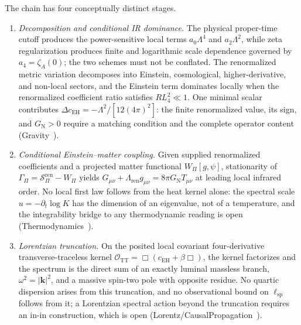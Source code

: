 \documentclass[11pt,a4paper]{article}
\theoremstyle{definition}
\newcommand{\SPI}{\mathcal{S}_\Pi}
\newcommand{\lsp}{\ell_{\mathrm{sp}}}
\newcommand{\GN}{G_{\mathrm{N}}}
\newcommand{\cEH}{c_{\mathrm{EH}}}
\begin{document}
    The chain has four conceptually distinct stages.

    \begin{enumerate}
      \item \textit{Decomposition and conditional IR dominance.}
      The physical proper-time cutoff produces the power-sensitive local terms
      $a_0\Lambda^4$ and $a_2\Lambda^2$, while zeta regularization produces finite and
      logarithmic scale dependence governed by $a_4 = \zeta_A(0)$; the two schemes must not
      be conflated.
      The renormalized metric variation decomposes into Einstein, cosmological,
      higher-derivative, and non-local sectors, and the Einstein term dominates locally when
      the renormalized coefficient ratio satisfies $R L_4^2 \ll 1$.
      One minimal scalar contributes $\Delta\cEH = -\Lambda^2/[12(4\pi)^2]$: the finite
      renormalized value, its sign, and $\GN > 0$ require a matching condition and the
      complete operator content (Gravity~\cite{Beau2026h}).

      \item \textit{Conditional Einstein--matter coupling.}
      Given supplied renormalized coefficients and a projected matter functional
      $W_\Pi[g, \psi]$, stationarity of $\Gamma_\Pi = \SPI^{\mathrm{ren}} - W_\Pi$ yields
      $G_{\mu\nu} + \Lambda_{\mathrm{ren}} g_{\mu\nu} = 8\pi\GN T_{\mu\nu}$ at leading local infrared order.
      No local first law follows from the heat kernel alone: the spectral scale
      $u = -\partial_t\log K$ has the dimension of an eigenvalue, not of a temperature, and
      the integrability bridge to any thermodynamic reading is open
      (Thermodynamics~\cite{Beau2026Thermodynamics}).

      \item \textit{Lorentzian truncation.}
      On the posited local covariant four-derivative transverse-traceless kernel
      $\mathcal{O}_{\mathrm{TT}} = \Box(\cEH + \beta\Box)$, the kernel factorizes and the
      spectrum is the direct sum of an exactly luminal massless branch,
      $\omega^2 = |\mathbf{k}|^2$, and a massive spin-two pole with opposite residue.
      No quartic dispersion arises from this truncation, and no observational bound on
      $\lsp$ follows from it; a Lorentzian spectral action beyond the truncation requires an
      in-in construction, which is open (Lorentz/CausalPropagation~\cite{Beau2026i}).


\end{enumerate}
\end{document}
